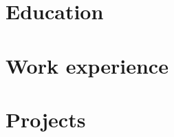 \documentclass[]{resume}
\begin{document}
\makeprofile







\newcommand{\itemwidth}{10cm}
\newcommand{\chronowidth}{2.5cm}


\begin{adjustwidth}{10pt}{10pt}

\section*{Education}


\renewcommand{\twentylen}{\itemwidth}
\begin{twenty}[\chronowidth]
    
    
\end{twenty}



\section*{Work experience}
\renewcommand{\twentylen}{\itemwidth}
\begin{twenty}[\chronowidth]
    
\end{twenty}


\section*{Projects}


\end{adjustwidth}
\end{document}
